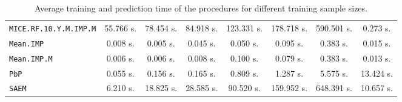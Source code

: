 \begin{table}[htbp]
\begin{tabular}{|l|c|c|c|c|c|c|c|}
\texttt{MICE.RF.10.Y.M.IMP.M} & 55.766 s. & 78.454 s. & 84.918 s. & 123.331 s. & 178.718 s. & 590.501 s. & 0.273 s. \\
\texttt{Mean.IMP} & 0.008 s. & 0.005 s. & 0.045 s. & 0.050 s. & 0.095 s. & 0.383 s. & 0.015 s. \\
\texttt{Mean.IMP.M} & 0.006 s. & 0.006 s. & 0.008 s. & 0.100 s. & 0.079 s. & 0.383 s. & 0.013 s. \\
\texttt{PbP} & 0.055 s. & 0.156 s. & 0.165 s. & 0.809 s. & 1.287 s. & 5.575 s. & 13.424 s. \\
\texttt{SAEM} & 6.210 s. & 18.825 s. & 28.585 s. & 90.520 s. & 159.952 s. & 648.391 s. & 10.657 s. \\
\bottomrule
\end{tabular}
\caption{Average training and prediction time of the procedures for different training sample sizes.}
\label{tab:runtimeSimA}
\end{table}

